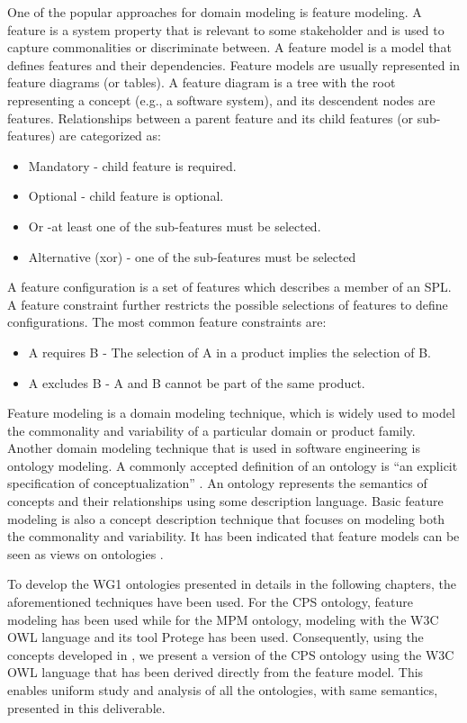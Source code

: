 \documentclass[final]{include/MPM4CPS/MPM4CPS-Report} %
\newcommand{\uidx}[1]{\index[used]{#1}}  %
\begin{document}
One of the popular approaches for domain modeling is feature modeling. A feature
is a system property that is relevant to some stakeholder\uidx{Stakeholder} and is used to capture
commonalities or discriminate between. A feature model is a model that defines
features and their dependencies. Feature models are usually represented in
feature diagrams (or tables). A feature diagram is a tree with the root
representing a concept (e.g., a software system), and its descendent nodes are
features. Relationships between a parent feature and its child features (or
sub-features) are categorized as:

\begin{itemize}
	\item Mandatory - child feature is required.
	\item Optional - child feature is optional.
	\item Or -at least one of the sub-features must be selected.
	\item Alternative (xor) - one of the sub-features must be selected
\end{itemize}

A feature configuration is a set of features which describes a member of an SPL.
A feature constraint further restricts the possible selections of features to
define configurations.  The most common feature constraints\uidx{Constraint} are:

\begin{itemize}
	\item A requires B - The selection of A in a product implies the selection of B.
	\item A excludes B - A and B cannot be part of the same product.
\end{itemize}

Feature modeling is a domain modeling technique, which is widely used to model
the commonality and variability of a particular domain or product family.
Another domain modeling technique that is used in software engineering is
ontology modeling. A commonly accepted definition of an ontology is
``an explicit specification of conceptualization'' \cite{Gruber1995}. An
ontology represents the semantics of concepts and their relationships using some description language. Basic feature modeling is also a concept description technique that focuses on modeling both the commonality and variability. It has been indicated that feature models can be seen as views on ontologies \cite{Czarnecki2006}.

To develop the WG1 ontologies presented in details in the following chapters, the aforementioned techniques have been used. For the CPS ontology, feature modeling has been used while for the MPM ontology, modeling with the W3C OWL language and its tool Protege has been used. Consequently, using the concepts developed in \cite{Czarnecki2006}, we present a version of the CPS ontology using the W3C OWL language that has been derived directly from the feature model. This enables uniform study and analysis of all the ontologies, with same semantics, presented in this deliverable. 
\end{document}
